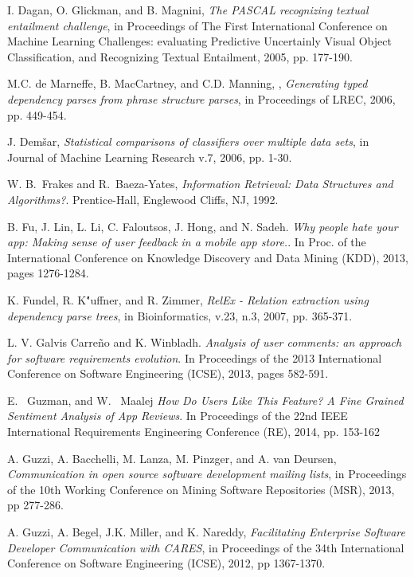 \documentclass[conference]{IEEEtran}
\begin{document}
\begin{thebibliography}{1}
I. Dagan, O. Glickman, and B. Magnini,  \emph{The PASCAL recognizing textual entailment challenge}, in Proceedings of The First International Conference on Machine Learning Challenges: evaluating Predictive Uncertainly Visual Object Classification, and Recognizing Textual Entailment, 2005, pp. 177-190.

M.C. de Marneffe, B. MacCartney, and C.D. Manning, , \emph{Generating typed dependency parses from phrase structure parses}, in Proceedings of LREC, 2006, pp. 449-454.

J. Dem{\v s}ar,  \emph{Statistical comparisons of classifiers over multiple data sets}, in Journal of Machine Learning Research v.7, 2006, pp. 1-30.

W. B.~Frakes and R.~Baeza-Yates, \emph{Information Retrieval: Data Structures and Algorithms?}. Prentice-Hall, Englewood Cliffs, NJ, 1992.

B. Fu, J. Lin, L. Li, C. Faloutsos, J. Hong, and N. Sadeh. \emph{Why people hate your app: Making sense of user feedback in a mobile app store.}. In Proc. of the International Conference on Knowledge Discovery and Data Mining (KDD), 2013, pages 1276-1284.

K. Fundel, R. K\'"uffner, and R. Zimmer, \emph{RelEx - Relation extraction using dependency parse trees}, in Bioinformatics, v.23, n.3, 2007, pp. 365-371.

L. V. Galvis Carreño and K. Winbladh. \emph{Analysis of user comments: an approach for software requirements evolution}. In Proceedings of the 2013 International Conference on Software Engineering (ICSE), 2013, pages 582-591. 

E. ~Guzman, and W. ~Maalej \emph{How Do Users Like This Feature? A Fine Grained Sentiment Analysis of App Reviews}. In Proceedings of the 22nd IEEE International  Requirements Engineering Conference (RE), 2014, pp. 153-162

A. Guzzi, A. Bacchelli, M. Lanza, M. Pinzger, and A. van Deursen, 
\emph{Communication in open source software development mailing lists},
in Proceedings of the 10th Working Conference on Mining Software Repositories 
(MSR), 2013, pp 277-286. 

A. Guzzi, A. Begel, J.K. Miller, and K. Nareddy, 
\emph{Facilitating Enterprise Software Developer Communication with CARES},
in Proceedings of the 34th International Conference on Software Engineering 
(ICSE), 2012, pp 1367-1370. 


\end{thebibliography}
\end{document}
